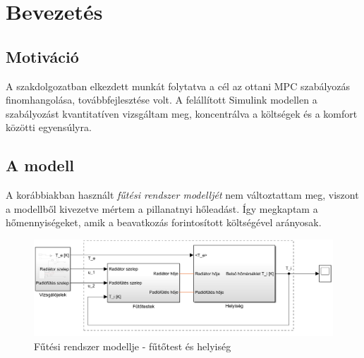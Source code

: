

%	
%

\chapter{Bevezetés}

\section{Motiváció} A szakdolgozatban elkezdett munkát folytatva a cél az ottani MPC szabályozás finomhangolása, továbbfejlesztése volt. 
A felállított Simulink modellen a szabályozást kvantitatíven vizsgáltam meg, koncentrálva a költségek és a komfort közötti egyensúlyra. 


\section{A modell}
A korábbiakban használt \textit{fűtési rendszer modelljét} nem változtattam meg, viszont a modellből kivezetve mértem a pillanatnyi hőleadást. Így megkaptam a hőmennyiségeket, amik a beavatkozás forintosított költségével arányosak. 


\begin{figure}[H]
	\centering
	\includegraphics[trim=0 0 0 0, clip,width=\textwidth]{figures/simulink-network-minimalist-layout}
	\caption{Fűtési rendszer modellje - fűtőtest és helyiség}
	\label{fig:Simulink-minimalist}
\end{figure}

